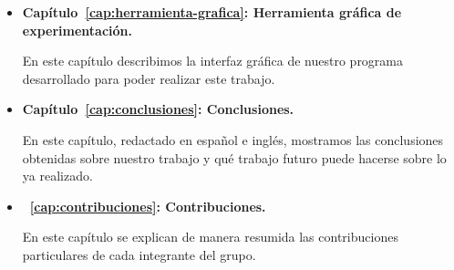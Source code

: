 \begin{itemize}
\item \textbf{Capítulo~\ref{cap:herramienta-grafica}: Herramienta gráfica de experimentación.}

En este capítulo describimos la interfaz gráfica de nuestro programa desarrollado para poder realizar este trabajo.

\item \textbf{Capítulo~\ref{cap:conclusiones}: Conclusiones.}

En este capítulo, redactado en español e inglés, mostramos las conclusiones obtenidas sobre nuestro trabajo y qué trabajo futuro puede hacerse sobre lo ya realizado. 

\item \textbf{~\ref{cap:contribuciones}: Contribuciones.}

En este capítulo se explican de manera resumida las contribuciones particulares de cada integrante del grupo.

\end{itemize}
